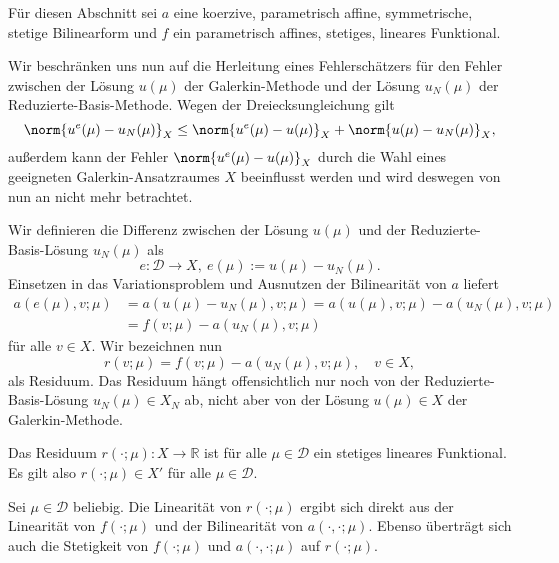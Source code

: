 Für diesen Abschnitt sei $a$ eine koerzive, parametrisch affine, symmetrische, stetige Bilinearform und $f$ ein parametrisch affines, stetiges, lineares Funktional.

Wir beschränken uns nun auf die Herleitung eines Fehlerschätzers für den Fehler zwischen der Lösung $u(\mu)$ der Galerkin-Methode und der Lösung $u_N(\mu)$ der Reduzierte-Basis-Methode. Wegen der Dreiecksungleichung gilt
\begin{equation}
    \norm{u^e(\mu) - u_N(\mu)}_X \leq \norm{u^e(\mu) - u(\mu)}_X + \norm{u(\mu) - u_N(\mu)}_X,
\end{equation}
außerdem kann der Fehler $\norm{u^e(\mu) - u(\mu)}_X$ durch die Wahl eines geeigneten Galerkin-Ansatzraumes $X$ beeinflusst werden und wird deswegen von nun an nicht mehr betrachtet.

Wir definieren die Differenz zwischen der Lösung $u(\mu)$ und der Reduzierte-Basis-Lösung $u_N(\mu)$ als
\begin{equation}
    \label{eq:fehler_fe_und_rb_lsg}
    e \colon \mathcal D \to X, ~
    e(\mu) := u(\mu) - u_N(\mu).
\end{equation}
Einsetzen in das Variationsproblem und Ausnutzen der Bilinearität von $a$ liefert
\begin{align}
    a(e(\mu), v; \mu)
    &= a(u(\mu) - u_N(\mu), v; \mu)
    = a(u(\mu), v; \mu) - a(u_N(\mu), v; \mu) \\
    &= f(v; \mu) - a(u_N(\mu), v; \mu)
\end{align}
für alle $v \in X$.
Wir bezeichnen nun
\begin{equation}
    \label{eq:def_residuum}
    r(v; \mu) = f(v; \mu) - a(u_N(\mu), v; \mu), \quad v \in X,
\end{equation}
als Residuum.
Das Residuum hängt offensichtlich nur noch von der Reduzierte-Basis-Lösung $u_N(\mu) \in X_N$ ab, nicht aber von der Lösung $u(\mu) \in X$ der Galerkin-Methode.

\begin{Lemma}
    Das Residuum $r(\cdot; \mu) \colon X \to \mathbb{R}$ ist für alle $\mu \in \mathcal D$ ein stetiges lineares Funktional. Es gilt also $r(\cdot; \mu) \in X'$ für alle $\mu \in \mathcal D$.

    \begin{Beweis}
    Sei $\mu \in \mathcal D$ beliebig.
    Die Linearität von $r(\cdot; \mu)$ ergibt sich direkt aus der Linearität von $f(\cdot; \mu)$ und der Bilinearität von $a(\cdot, \cdot; \mu)$.
    Ebenso überträgt sich auch die Stetigkeit von $f(\cdot; \mu)$ und $a(\cdot, \cdot; \mu)$ auf $r(\cdot; \mu)$.
    \end{Beweis}
\end{Lemma}

